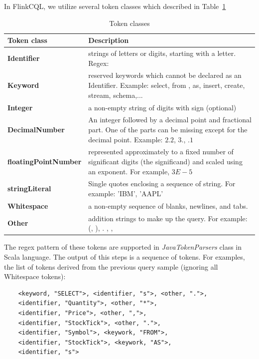 In FlinkCQL, we utilize several token classes which described in Table~\ref{table:TokenClass}


\begin{table}[h]
\caption{Token classes}
\centering
\label{table:TokenClass}
\setlength\extrarowheight{5pt}
\begin{tabular}{||>{\centering\bfseries}m{2in}   |>{\centering\arraybackslash}m{3in}||}
\hline
\textbf{Token class} & \textbf{Description} \\ \hline\hline
                 Identifier  & strings of letters or digits, starting with a letter. Regex: 
                                \\ \hline
                   Keyword	  & reserved keywords which cannot be declared as an Identifier. Example: select, from , as, insert, create, stream, schema,... \\ \hline
                   Integer		& a non-empty string of digits with sign (optional) \\ \hline %
				   DecimalNumber		&  An integer followed by a decimal point and fractional part. One of the parts can be missing except for the decimal point. Example: $2.2$, $3.$, $.1$   \\ \hline %
					floatingPointNumber	& represented approximately to a fixed number of significant digits (the significand) and scaled using an exponent. For example, $3E-5$			               \\ \hline		%
					stringLiteral		& Single quotes enclosing a sequence of string. For example: 'IBM', 'AAPL'			 \\ \hline
					Whitespace		& a non-empty sequence of blanks, newlines, and tabs.	 		                      \\ \hline								
					Other	& addition strings to make up the query. For example: (, ), . , {, }		                     \\ \hline							           							           							           							           
\end{tabular}
\end{table}

The regex pattern of these tokens are supported in \textit{JavaTokenParsers} class in Scala language. The output of this steps is a sequence of tokens. For examples, the list of tokens derived from the previous query sample (ignoring all Whitespace tokens):
\begin{lstlisting}
	<keyword, "SELECT">, <identifier, "s">, <other, ".">,
	<identifier, "Quantity">, <other, "*">, 
	<identifier, "Price">, <other, ",">, 
	<identifier, "StockTick">, <other, ".">,
	<identifier, "Symbol">, <keywork, "FROM">,
	<identifier, "StockTick">, <keywork, "AS">, 
	<identifier, "s">   
\end{lstlisting}

